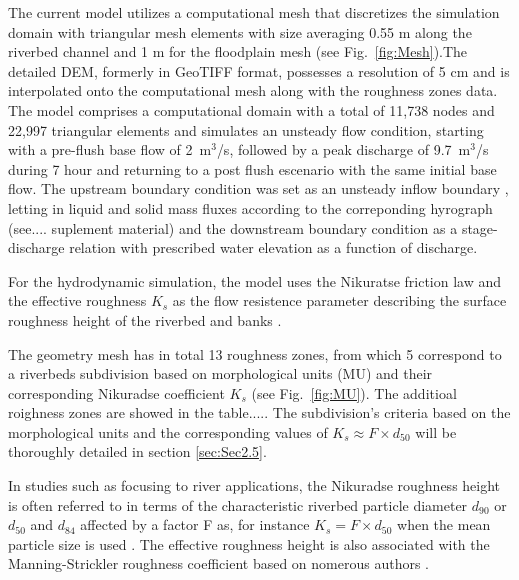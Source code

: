 \documentclass[draft,linenumbers,onecolumn]{agujournal2019} %
\begin{document}
The current model utilizes a computational mesh that discretizes the simulation domain with triangular mesh elements with size averaging 0.55 m along the riverbed channel and 1 m for the floodplain mesh (see Fig.~\ref{fig:Mesh}).The detailed DEM, formerly in GeoTIFF format, possesses a resolution of 5 cm and is interpolated onto the computational mesh along with the roughness zones data. The model comprises a computational domain with a total of 11,738 nodes and 22,997 triangular elements and simulates an unsteady flow condition, starting with a pre-flush base flow of 2~m$^3$/s, followed by a peak discharge of 9.7~m$^3$/s during 7 hour and returning to a post flush escenario with the same initial base flow. The upstream boundary condition was set as an unsteady inflow boundary , letting in liquid and solid mass fluxes according to the correponding hyrograph (see.... suplement material)  and the downstream boundary condition as a stage-discharge relation with prescribed water elevation as a function of discharge. 

For the hydrodynamic simulation, the model uses the Nikuratse friction law and the effective roughness \(K_{s}\) as the flow resistence parameter describing the surface roughness height of the riverbed and banks \cite{nikuradse1933stroemungsgesetze,marriott2010hydraulic,webber2018fluid,hervouet2020telemac2d}. 

The geometry mesh has in total 13 roughness zones, from which 5 correspond to a riverbeds subdivision based on morphological units (MU) and their corresponding Nikuradse coefficient \(K_{s}\) (see Fig.~\ref{fig:MU}). The additioal roighness zones are showed in the table.....  The subdivision's criteria based on the morphological units  and the corresponding values of \( K_{s} \approx F \times d_{50} \) will be thoroughly detailed in section \ref{sec:Sec2.5}.



In studies such as \cite{meyer-peter1948formulas, ferguson2007flow, rickenmann2011evaluation} focusing to river applications, the Nikuradse roughness height is often referred to in terms of the characteristic riverbed particle diameter \(d_{90}\) or \(d_{50}\) and \(d_{84}\) affected by a factor F as, for instance \( K_{s} = F \times d_{50} \) when the mean particle size is used \cite{meyer-peter1948formulas,tassi2023gaia}. The effective roughness height is also associated with the Manning-Strickler roughness coefficient based on nomerous authors \cite{meyer-peter1948formulas,smart1999coefficient,ferguson2007flow}.
\end{document}
